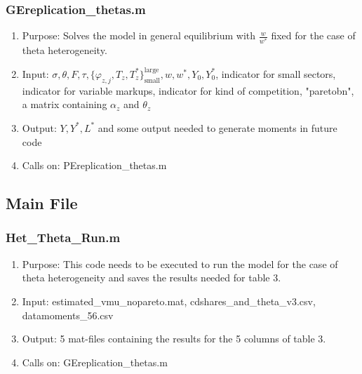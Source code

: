 \documentclass[12pt,a4paper,oneside]{article}
\begin{document}
\subsubsection{GEreplication\_thetas.m}
\begin{enumerate}
\item Purpose: Solves the model in general equilibrium with $\frac{w}{w^*}$ fixed for the case of theta heterogeneity. 
\item Input: $\sigma, \theta, F, \tau, \{\varphi_{z,j}, T_z, T_z^*\}_{\text{small}}^{\text{large}}, w, w^*, Y_0, Y_0^*$, indicator for small sectors, indicator for variable markups, indicator for kind of competition, "paretobn", a matrix containing $\alpha_z$ and $\theta_z$
\item Output: $Y, Y^*, L^*$ and some output needed to generate moments in future code
\item Calls on: PEreplication\_thetas.m
\end{enumerate}

\subsection{Main File}

\subsubsection{Het\_Theta\_Run.m}
\begin{enumerate}
\item Purpose: This code needs to be executed to run the model for the case of theta heterogeneity and saves the results needed for table 3.
\item Input: estimated\_vmu\_nopareto.mat, cdshares\_and\_theta\_v3.csv, datamoments\_56.csv
\item Output: 5 mat-files containing the results for the 5 columns of table 3.
\item Calls on: GEreplication\_thetas.m
\end{enumerate}
\end{document}

